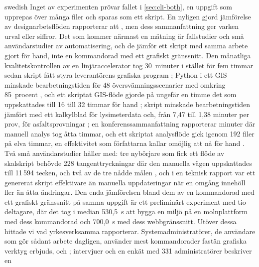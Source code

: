 \begin{onlyin}{swedish}
Inget av experimenten prövar fallet i \cref{sec:cli-both}, en uppgift
som upprepas över många filer och sparas som ett skript.  En nyligen
gjord jämförelse av designarbetsflöden rapporterar att
, men dess sammanfattning ger varken urval eller siffror.  Det
som kommer närmast en mätning är fallstudier och små användarstudier av
automatisering, och de jämför ett skript med samma arbete gjort för hand,
inte en kommandorad med ett grafiskt gränssnitt.  Den månatliga
kvalitetskontrollen av en linjäraccelerator tog 30~minuter i stället för
fem timmar sedan skript fått styra leverantörens grafiska program
\autocite{Skinner2019Factor}; Python i ett GIS minskade
bearbetningstiden för 48 översvämningsscenarier med omkring 85~procent
\autocite{Mandal2025Semi}, och ett skriptat GIS-flöde gjorde på ungefär
en timme det som uppskattades till 16 till 32 timmar för hand
\autocite{Pinto2026Semi}; skript minskade bearbetningstiden jämfört med
ett kalkylblad för lysimeterdata\autocite{Colaizzi2025Algorithms} och,
från 7,47 till 1,38 minuter per prov, för asfaltsprovningar
\autocite{Khakim2026Deterministic}; en konferenssammanfattning rapporterar
minuter där manuell analys tog åtta timmar\autocite{Sledziowski2026Expert},
och ett skriptat analysflöde gick igenom 192 filer på elva timmar, en
effektivitet som författarna kallar omöjlig att nå för hand
\autocite{Kiseleva2018Proteomic}.
Två små användarstudier håller med: tre nybörjare som fick ett flöde av
skalskript behövde 228 tangenttryckningar där den manuella vägen
uppskattades till 11\,594 tecken, och två av de tre nådde målen
\autocite{Fung2021QIIME}, och i en teknisk rapport var ett genererat
skript effektivare än manuella uppdateringar när en omgång innehöll fler
än åtta ändringar\autocite{Tomasic2006Workflow}.  Den enda jämförelsen
bland dem av en kommandorad med ett grafiskt gränssnitt på samma uppgift
är ett preliminärt experiment med tio deltagare, där det tog i median
530,5~s att bygga en miljö på en molnplattform med dess kommandorad och
700,0~s med dess webbgränssnitt\autocite{Shiro2026Block}.  Utöver dessa
hittade vi vad yrkesverksamma rapporterar.
Systemadministratörer, de användare som gör sådant arbete dagligen,
använder mest kommandorader fastän grafiska verktyg erbjuds, och
; intervjuer och en enkät med
331 administratörer beskriver en
\end{onlyin}
